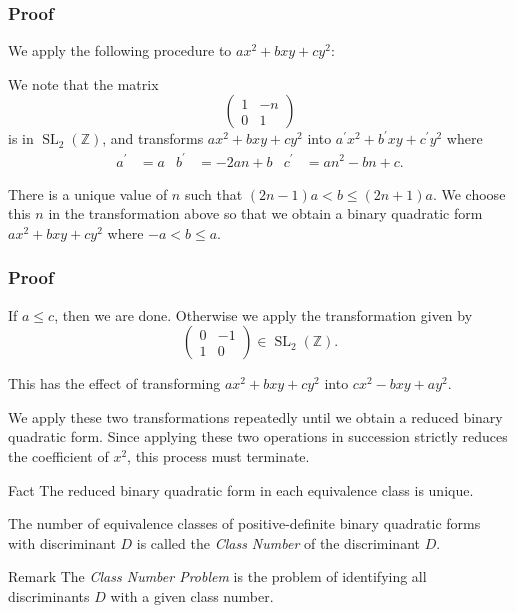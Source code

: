 \documentclass[handout]{beamer}
\begin{document}
\begin{frame}
	
	\frametitle{Proof}

	We apply the following procedure to $ax^2 + bxy + cy^2$:

	We note that the matrix
	\[
		\begin{pmatrix} 1 & -n \\ 0 & 1 \end{pmatrix}
	\]
	is in $\operatorname{SL}_2(\mathbb{Z})$, and transforms $ax^2 + bxy + cy^2$ into $a^\prime x^2 + b^\prime xy + c^\prime y^2$ where
	\begin{align*}
		a^\prime & = a & b^\prime & = -2an + b & c^\prime & = an^2 - bn + c.
	\end{align*}
	\pause

	There is a unique value of $n$ such that $(2n - 1)a < b \leq (2n + 1)a$. We choose this $n$ in the transformation above so that we obtain a binary quadratic form $ax^2 + bxy + cy^2$ where $-a < b \leq a$. \pause

\end{frame}

\begin{frame}
	
	\frametitle{Proof}

	If $a \leq c$, then we are done. Otherwise we apply the transformation given by
	\[
		\begin{pmatrix} 0 & -1 \\ 1 & 0 \end{pmatrix} \in \operatorname{SL}_2(\mathbb{Z}).
	\]
	\pause

	This has the effect of transforming $ax^2 + bxy + cy^2$ into $cx^2 - bxy + ay^2$. \pause

	We apply these two transformations repeatedly until we obtain a reduced binary quadratic form. Since applying these two operations in succession strictly reduces the coefficient of $x^2$, this process must terminate.

\end{frame}

\begin{frame}

	\begin{block}{Fact}
		The reduced binary quadratic form in each equivalence class is unique.
	\end{block}

	\begin{definition}
		The number of equivalence classes of positive-definite binary quadratic forms with discriminant $D$ is called the \emph{Class Number} of the discriminant $D$.
	\end{definition}

	\begin{block}{Remark}
		The \emph{Class Number Problem} is the problem of identifying all discriminants $D$ with a given class number.
	\end{block}

\end{frame}
\end{document}
